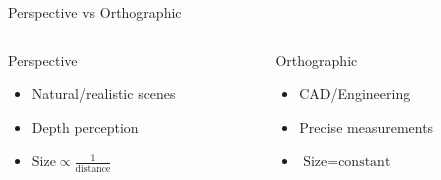\begin{frame}{Perspective vs Orthographic}
  \begin{center}
  \end{center}
  \vspace*{-0.3cm}
  \begin{columns}
    \footnotesize
    \begin{column}{0.5\textwidth}
      \begin{raybox}{Perspective}
        \begin{itemize}
          \item Natural/realistic scenes
          \item Depth perception
          \item $\text{Size} \propto \frac{1}{\text{distance}}$
        \end{itemize}
      \end{raybox}
    \end{column}
    \begin{column}{0.5\textwidth}
      \begin{raybox}{Orthographic}
        \begin{itemize}
          \item CAD/Engineering
          \item Precise measurements
          \item $\text{Size} = \text{constant}$
        \end{itemize}
      \end{raybox}
    \end{column}
  \end{columns}
\end{frame}
